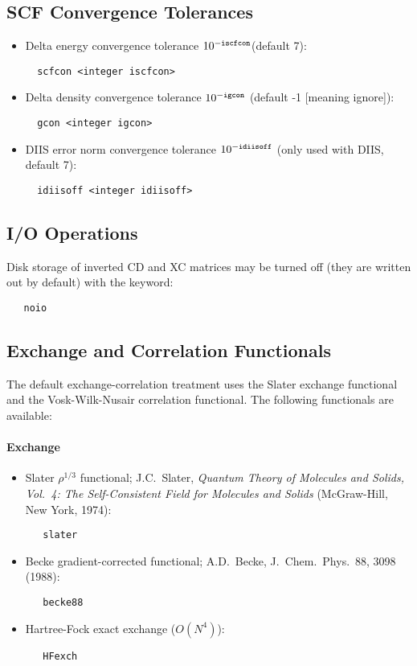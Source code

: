 \subsection{SCF Convergence Tolerances}
\begin{itemize}
\item Delta energy convergence tolerance $10^{-{\tt iscfcon}}$(default 7):
\begin{verbatim}
  scfcon <integer iscfcon>
\end{verbatim}
\item Delta density convergence tolerance $10^{-{\tt igcon}}$
  (default -1 [meaning ignore]):
\begin{verbatim}
  gcon <integer igcon>
\end{verbatim}
\item DIIS error norm convergence tolerance $10^{-{\tt idiisoff}}$ 
  (only used with DIIS, default 7):
\begin{verbatim}
  idiisoff <integer idiisoff>
\end{verbatim}
\end{itemize}


\subsection{I/O Operations}

Disk storage of inverted CD and XC matrices may be turned off 
(they are written out by default) with the keyword:
\begin{verbatim}
   noio
\end{verbatim}

\subsection{Exchange and Correlation Functionals}
The default exchange-correlation treatment uses the Slater exchange 
functional and the Vosk-Wilk-Nusair correlation functional.
The following functionals are available:
\paragraph{Exchange}
\begin{itemize}
\item  Slater $\rho^{1/3}$ functional; J.C.~Slater, 
  {\sl Quantum Theory of Molecules and
  Solids, Vol.~4: The Self-Consistent Field for Molecules and Solids}
(McGraw-Hill, New York, 1974):
\begin{verbatim}
   slater
\end{verbatim}
\item Becke gradient-corrected functional; 
  A.D.~Becke, J.~Chem.~Phys.~88, 3098 (1988):
\begin{verbatim}
   becke88
\end{verbatim}
\item Hartree-Fock exact exchange ($O(N^4)$):
\begin{verbatim}
   HFexch
\end{verbatim}
\end{itemize}

